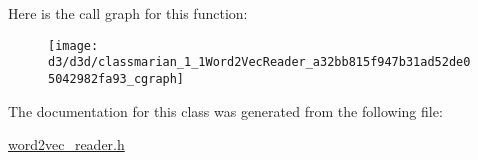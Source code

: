 Here is the call graph for this function\+:
\nopagebreak
\begin{figure}[H]
\begin{center}
\leavevmode
\texttt{[image: d3/d3d/classmarian\_1\_1Word2VecReader\_a32bb815f947b31ad52de05042982fa93\_cgraph]}
\end{center}
\end{figure}




The documentation for this class was generated from the following file\+:\begin{DoxyCompactItemize}
\item 
\hyperlink{word2vec__reader_8h}{word2vec\+\_\+reader.\+h}\end{DoxyCompactItemize}
